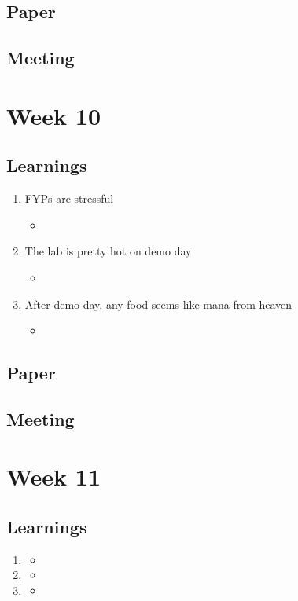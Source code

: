 \section{Paper}

\section{Meeting}
\chapter{Week 10}

\section{Learnings}
\begin{enumerate}
\item FYPs are stressful
\begin{itemize}
\item
\end{itemize}
\item The lab is pretty hot on demo day
\begin{itemize}
\item
\end{itemize}
\item After demo day, any food seems like mana from heaven
\begin{itemize}
\item
\end{itemize}
\end{enumerate}

\section{Paper}

\section{Meeting}
\chapter{Week 11}

\section{Learnings}
\begin{enumerate}
\item
\begin{itemize}
\item
\end{itemize}
\item
\begin{itemize}
\item
\end{itemize}
\item
\begin{itemize}
\item
\end{itemize}
\end{enumerate}

